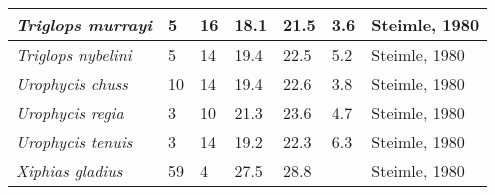 \documentclass[a4paper]{article} %
\begin{document}
\begin{landscape}
\begin{longtable}[]{|l|p{1.8cm}|p{2cm}|p{2cm}|p{2.15cm}|p{1.9cm}|l|}
    \textit{Triglops murrayi}                & 5                            & 16                         & 18.1                          & 21.5                              & 3.6                      & Steimle, 1980                \\ \hline
    \textit{Triglops nybelini}               & 5                            & 14                         & 19.4                          & 22.5                              & 5.2                      & Steimle, 1980                \\ \hline
    \textit{Urophycis chuss}                 & 10                           & 14                         & 19.4                          & 22.6                              & 3.8                      & Steimle, 1980                \\ \hline
    \textit{Urophycis regia}                 & 3                            & 10                         & 21.3                          & 23.6                              & 4.7                      & Steimle, 1980                \\ \hline
    \textit{Urophycis tenuis}                & 3                            & 14                         & 19.2                          & 22.3                              & 6.3                      & Steimle, 1980                \\ \hline
    \textit{Xiphias gladius}                 & 59                           & 4                          & 27.5                          & 28.8                              &                          & Steimle, 1980                \\ \hline
\end{longtable}
\pagestyle{plain}
\end{landscape}
\end{document}
